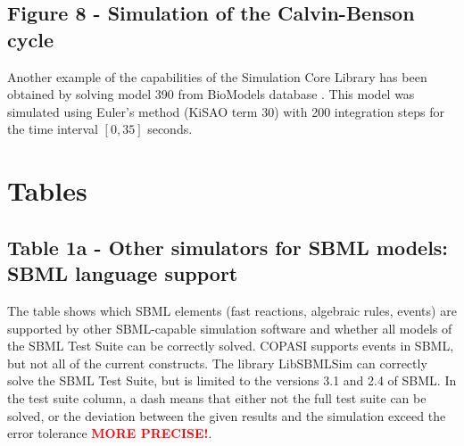 \documentclass[10pt]{bmc_article}
\newenvironment{bmcformat}{\baselineskip20pt\sloppy\setboolean{publ}{false}}{\baselineskip20pt\sloppy}
\newcommand{\TODO}[1]{\textcolor{red}{\textbf{#1}}}
\begin{document}
\begin{bmcformat}
\subsection*{Figure 8 - Simulation of the Calvin-Benson cycle}
Another example of the capabilities of the Simulation Core Library has been obtained by solving model 390 from BioModels database \cite{Novere2006a, Arnold2011}.
This model was simulated using Euler's method (KiSAO term 30) with 200 integration steps for the time interval $[0, 35]$ seconds.



\section*{Tables}

\subsection*{Table 1a - Other simulators for SBML models: SBML language support}
The table shows which SBML elements (fast reactions, algebraic rules, events) are supported by other SBML-capable 
simulation software and whether all models of the SBML Test Suite can be correctly solved.
COPASI supports events in SBML, but not all of the current constructs. The library LibSBMLSim can correctly
solve the SBML Test Suite, but is limited to the versions 3.1 and 2.4 of SBML. In the test suite column, a dash
means that either not the full test suite can be solved, or the deviation between the given results and the simulation
exceed the error tolerance \TODO{MORE PRECISE!}. 


\end{bmcformat}
\end{document}
